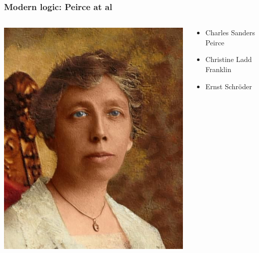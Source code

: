 \begin{frame}
  \frametitle{Modern logic: Peirce at al}

  \begin{columns}
    \begin{column}{.5\textwidth}
      \includegraphics[height=.8\textheight]{../assets/ladd-franklin}
    \end{column}
    \begin{column}{.5\textwidth}
      \begin{itemize}[<+->]
        \item Charles Sanders Peirce
        \item Christine Ladd Franklin
        \item Ernst Schr\"oder
      \end{itemize}
    \end{column}
  \end{columns}
\end{frame}

